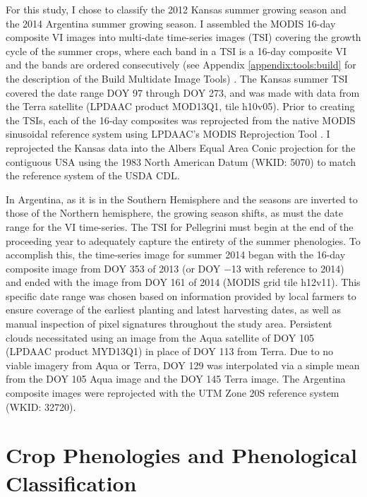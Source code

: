 For this study, I chose to classify the 2012 Kansas summer growing season and the 2014 Argentina summer growing season. I assembled the MODIS 16-day composite VI images into multi-date time-series images (TSI) covering the growth cycle of the summer crops, where each band in a TSI is a 16-day composite VI and the bands are ordered consecutively (see Appendix \ref{appendix:tools:build} for the description of the Build Multidate Image Tools) . The Kansas summer TSI covered the date range DOY 97 through DOY 273, and was made with data from the Terra satellite (LPDAAC product MOD13Q1, tile h10v05). Prior to creating the TSIs, each of the 16-day composites was reprojected from the native MODIS sinusoidal reference system using LPDAAC's MODIS Reprojection Tool . I reprojected the Kansas data into the Albers Equal Area Conic projection for the contiguous USA using the 1983 North American Datum (WKID: 5070) to match the reference system of the USDA CDL.

In Argentina, as it is in the Southern Hemisphere and the seasons are inverted to those of the Northern hemisphere, the growing season shifts, as must the date range for the VI time-series. The TSI for Pellegrini must begin at the end of the proceeding year to adequately capture the entirety of the summer phenologies. To accomplish this, the time-series image for summer 2014 began with the 16-day composite image from DOY 353 of 2013 (or DOY −13 with reference to 2014) and ended with the image from DOY 161 of 2014 (MODIS grid tile h12v11). This specific date range was chosen based on information provided by local farmers to ensure coverage of the earliest planting and latest harvesting dates, as well as manual inspection of pixel signatures throughout the study area. Persistent clouds necessitated using an image from the Aqua satellite of DOY 105 (LPDAAC product MYD13Q1) in place of DOY 113 from Terra. Due to no viable imagery from Aqua or Terra, DOY 129 was interpolated via a simple mean from the DOY 105 Aqua image and the DOY 145 Terra image. The Argentina composite images were reprojected with the UTM Zone 20S reference system (WKID: 32720).

\section{Crop Phenologies and Phenological Classification}
\label{chapter:methods:phenology-fitting}

